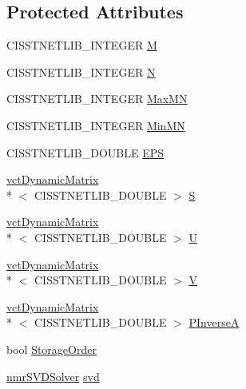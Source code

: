 \subsection*{Protected Attributes}
\begin{DoxyCompactItemize}
\item 
C\-I\-S\-S\-T\-N\-E\-T\-L\-I\-B\-\_\-\-I\-N\-T\-E\-G\-E\-R \hyperlink{classnmr_p_inverse_solver_a7e98835c5d1cf8493784b3789aa49c23}{M}
\item 
C\-I\-S\-S\-T\-N\-E\-T\-L\-I\-B\-\_\-\-I\-N\-T\-E\-G\-E\-R \hyperlink{classnmr_p_inverse_solver_a79a6789487c6022865700e2b4171ce60}{N}
\item 
C\-I\-S\-S\-T\-N\-E\-T\-L\-I\-B\-\_\-\-I\-N\-T\-E\-G\-E\-R \hyperlink{classnmr_p_inverse_solver_aafd3d099ed0e477769c41645744c3acd}{Max\-M\-N}
\item 
C\-I\-S\-S\-T\-N\-E\-T\-L\-I\-B\-\_\-\-I\-N\-T\-E\-G\-E\-R \hyperlink{classnmr_p_inverse_solver_a28485b3520282846c1b0e6f1137da9b2}{Min\-M\-N}
\item 
C\-I\-S\-S\-T\-N\-E\-T\-L\-I\-B\-\_\-\-D\-O\-U\-B\-L\-E \hyperlink{classnmr_p_inverse_solver_a7f262c9d12cdc03828834a3adacf1f52}{E\-P\-S}
\item 
\hyperlink{classvct_dynamic_matrix}{vct\-Dynamic\-Matrix}\\*
$<$ C\-I\-S\-S\-T\-N\-E\-T\-L\-I\-B\-\_\-\-D\-O\-U\-B\-L\-E $>$ \hyperlink{classnmr_p_inverse_solver_a76d3263b528c5531acbffe5909e716bd}{S}
\item 
\hyperlink{classvct_dynamic_matrix}{vct\-Dynamic\-Matrix}\\*
$<$ C\-I\-S\-S\-T\-N\-E\-T\-L\-I\-B\-\_\-\-D\-O\-U\-B\-L\-E $>$ \hyperlink{classnmr_p_inverse_solver_a25f08dc0a3380bb613f5e79b8cd9678a}{U}
\item 
\hyperlink{classvct_dynamic_matrix}{vct\-Dynamic\-Matrix}\\*
$<$ C\-I\-S\-S\-T\-N\-E\-T\-L\-I\-B\-\_\-\-D\-O\-U\-B\-L\-E $>$ \hyperlink{classnmr_p_inverse_solver_af28274cc42c66aa6fd7b48b04b35d249}{V}
\item 
\hyperlink{classvct_dynamic_matrix}{vct\-Dynamic\-Matrix}\\*
$<$ C\-I\-S\-S\-T\-N\-E\-T\-L\-I\-B\-\_\-\-D\-O\-U\-B\-L\-E $>$ \hyperlink{classnmr_p_inverse_solver_ae5a338f8aca820d47ac15fae99f29725}{P\-Inverse\-A}
\item 
bool \hyperlink{classnmr_p_inverse_solver_a1b9e3b3842e90c4de100681e8ed5f3a9}{Storage\-Order}
\item 
\hyperlink{classnmr_s_v_d_solver}{nmr\-S\-V\-D\-Solver} \hyperlink{classnmr_p_inverse_solver_ab8b996e0cc032076ff7035a4d471ff03}{svd}
\end{DoxyCompactItemize}



